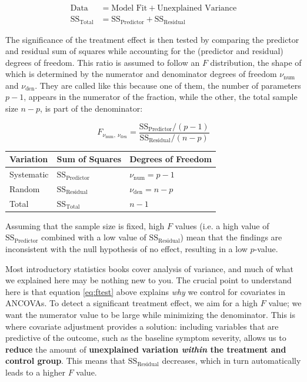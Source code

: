 \begin{align}
    \text{Data} &= \text{Model Fit} + \text{Unexplained Variance} \\
    \text{SS}_{\text{Total}} &= \text{SS}_{\text{Predictor}} + \text{SS}_{\text{Residual}} 
\end{align}

The significance of the treatment effect is then tested by comparing the predictor and residual sum of squares while accounting for the (predictor and residual) degrees of freedom. This ratio is assumed to follow an $F$ distribution, the shape of which is determined by the numerator and denominator degrees of freedom $\nu_{\text{num}}$ and $\nu_{\text{den}}$. They are called like this because one of them, the number of parameters $p-1$, appears in the numerator of the fraction, while the other, the total sample size $n - p$, is part of the denominator:

\begin{equation} \label{eq:ftest}
F_{\nu_{\text{num}},~\nu_{\text{den}}} = \frac{\text{SS}_{\text{Predictor}}/(p-1)}{\text{SS}_{\text{Residual}}/(n-p)}
\end{equation}

\begin{table}[!htbp]
\footnotesize
    \centering
    \begin{tabular}{lll} \toprule
    \textbf{Variation}  & \textbf{Sum of Squares }       & \textbf{Degrees of Freedom} \\\midrule
    Systematic          & $\text{SS}_{\text{Predictor}}$ & $\nu_{\text{num}}=p-1$ \\
    Random              & $\text{SS}_{\text{Residual}}$  & $\nu_{\text{den}}=n-p$ \\ \midrule
    Total               & $\text{SS}_{\text{Total}}$     & $n-1$                  \\\bottomrule
    \end{tabular}
\end{table}

Assuming that the sample size is fixed, high $F$ values (i.e. a high value of $\text{SS}_{\text{Predictor}}$ combined with a low value of $\text{SS}_{\text{Residual}}$) mean that the findings are inconsistent with the null hypothesis of no effect, resulting in a low $p$-value.

Most introductory statistics books cover analysis of variance, and much of what we explained here may be nothing new to you. The crucial point to understand here is that equation \ref{eq:ftest} above explains \emph{why} we control for covariates in ANCOVAs. To detect a significant treatment effect, we aim for a high $F$ value; we want the numerator value to be large while minimizing the denominator. This is where covariate adjustment provides a solution: including variables that are predictive of the outcome, such as the baseline symptom severity, allows us to \textbf{reduce} the amount of \textbf{unexplained variation \emph{within} the treatment and control group}. This means that $\text{SS}_{\text{Residual}}$ decreases, which in turn automatically leads to a higher $F$ value. 

